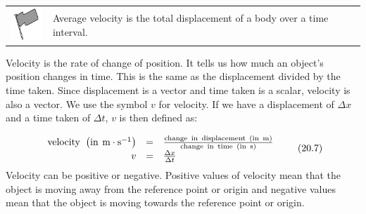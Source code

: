 \label{m38791*fhsst!!!underscore!!!id524}\begin{definition}
	  \begin{tabular*}{15 cm}{m{15 mm}m{}}
	\hspace*{-50pt}  \includegraphics[width=0.5in]{col11305.imgs/psflag2.png}   & \Definition{   \label{id2528820}\textbf{ Average velocity }} { \label{m38791*meaningfhsst!!!underscore!!!id524}
      \label{m38791*id64246}Average velocity is the total displacement of a body over a time interval. \par 
       } 
      \end{tabular*}
      \end{definition}
      \label{m38791*id64258}Velocity is the rate of change of position. It tells us how much an object's position changes in time. This is the same as the displacement divided by the time taken. Since displacement is a vector and time taken is a scalar, velocity is also a vector. We use the symbol $v$ for velocity. If we have a displacement of $\Delta x$ and a time taken of $\Delta t$, $v$ is then defined as:\par 
      \label{m38791*id64307}\nopagebreak\noindent{}
    \begin{equation}
    \begin{array}{ccc}\hfill \mathrm{velocity}\phantom{\rule{4pt}{0ex}}\left(\mathrm{in}\phantom{\rule{4pt}{0ex}}\mathrm{m}\ensuremath{\cdot}{\mathrm{s}}^{-1}\right)& =& \frac{\mathrm{change}\phantom{\rule{4pt}{0ex}}\mathrm{in}\phantom{\rule{4pt}{0ex}}\mathrm{displacement}\phantom{\rule{4pt}{0ex}}\left(\mathrm{in}\phantom{\rule{4pt}{0ex}}\mathrm{m}\right)}{\mathrm{change}\phantom{\rule{4pt}{0ex}}\mathrm{in}\phantom{\rule{4pt}{0ex}}\mathrm{time}\phantom{\rule{4pt}{0ex}}\left(\mathrm{in}\phantom{\rule{4pt}{0ex}}\mathrm{s}\right)}\hfill \\ \hfill v& =& \frac{\Delta x}{\Delta t}\hfill \end{array}\tag{20.7}
      \end{equation}
      \label{m38791*id64460}Velocity can be positive or negative. Positive values of velocity mean that the object is moving away from the reference point or origin and negative values mean that the object is moving towards the reference point or origin.\par 
\label{m38791*notfhsst!!!underscore!!!id615}
